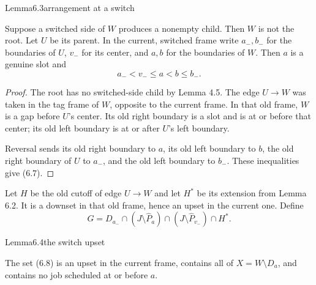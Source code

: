 \begin{numbered}{Lemma}{6.3}{arrangement at a switch}

Suppose a switched side of \(W\) produces a nonempty child. Then \(W\) is not the root. Let \(U\) be its parent. In the current, switched frame write \(a_-,b_-\) for the boundaries of \(U\), \(v_-\) for its center, and \(a,b\) for the boundaries of \(W\). Then \(a\) is a genuine slot and \[
a_-<v_-\leq a<b\leq b_-.
\tag{6.7}
\]

\end{numbered}

\begin{proof}
The root has no switched-side child by Lemma 4.5. The edge \(U\to W\) was taken in the tag frame of \(W\), opposite to the current frame. In that old frame, \(W\) is a gap before \(U\)'s center. Its old right boundary is a slot and is at or before that center; its old left boundary is at or after \(U\)'s left boundary.

Reversal sends its old right boundary to \(a\), its old left boundary to \(b\), the old right boundary of \(U\) to \(a_-\), and the old left boundary to \(b_-\). These inequalities give (6.7).
\end{proof}

Let \(H\) be the old cutoff of edge \(U\to W\) and let \(H^*\) be its extension from Lemma 6.2. It is a downset in that old frame, hence an upset in the current one. Define \[
G
=
D_{a_-}
\cap(J\setminus\widehat P_a)
\cap(J\setminus\widehat P_{v_-})
\cap H^*.
\tag{6.8}
\]

\begin{numbered}{Lemma}{6.4}{the switch upset}

The set (6.8) is an upset in the current frame, contains all of \(X=W\setminus D_a\), and contains no job scheduled at or before \(a\).

\end{numbered}

